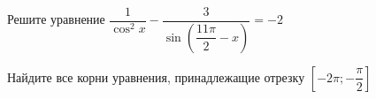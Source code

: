 \begin{ex}
	\begin{condition}
		\begin{enumcols}[label=\asbuk*)]
			\item Решите уравнение \( \dfrac{1}{\cos^2 x} - \dfrac{3}{\sin\left(\dfrac{11\pi}{2}-x\right)} = -2 \)
			\item Найдите все корни уравнения, принадлежащие отрезку \( \left[-2\pi;-\dfrac{\pi}{2}\right] \)
		\end{enumcols}
	\end{condition}
\end{ex}